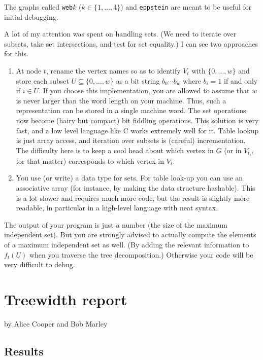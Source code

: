 \documentclass{tufte-handout}
\begin{document}
The graphs called {\tt web$k$} ($k\in\{1,\ldots,4\}$) and {\tt eppstein} are meant to be useful for initial debugging.

A lot of my attention was spent on handling sets.
(We need to iterate over subsets, take set intersections, and test for set equality.)
I can see two approaches for this.
\begin{enumerate}
  \item At node $t$, rename the vertex names so as to identify $V_t$ with $\{0,\ldots, w\}$ and store each subset $U\subseteq \{0,\ldots,w\}$ as a bit string $b_0\cdots b_w$ where $b_i=1$ if and only if $i\in U$.
    If you choose this implementation, you are allowed to assume that $w$ is never larger than the word length on your machine.
    Thus, such a representation can be stored in a single machine word.
    The set operations now become (hairy but compact) bit fiddling operations.
    This solution is very fast, and a low level language like C works extremely well for it.
    Table lookup is just array access, and iteration over subsets is (careful) incrementation.
    The difficulty here is to keep a cool head about which vertex in $G$ (or in $V_{t_i}$, for that matter) corresponds to which vertex in $V_t$.
  \item You use (or write) a data type for sets.
    For table look-up you can use an associative array (for instance, by making the data structure hashable).
      This is a lot slower and requires much more code, but the result is slightly more readable, in particular in a high-level language with neat syntax.
\end{enumerate}

The output of your program is just a number (the size of the maximum independent set).
But you are strongly advised to actually compute the elements of a maximum independent set as well.
(By adding the relevant information to $f_t(U)$ when you traverse the tree decomposition.)
Otherwise your code will be very difficult to debug.

\newpage
\section{Treewidth report}


by Alice Cooper and Bob Marley


\subsection{Results}
\end{document}
